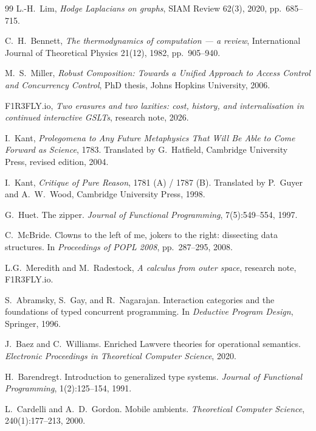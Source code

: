 \begin{thebibliography}{99}
L.-H.~Lim, \emph{Hodge Laplacians on graphs}, SIAM Review 62(3), 2020, pp.~685--715.

C.~H.~Bennett, \emph{The thermodynamics of computation --- a review}, International Journal of Theoretical Physics 21(12), 1982, pp.~905--940.

M.~S.~Miller, \emph{Robust Composition: Towards a Unified Approach to Access Control and Concurrency Control}, PhD thesis, Johns Hopkins University, 2006.

F1R3FLY.io, \emph{Two erasures and two laxities: cost, history, and internalisation in continued interactive GSLTs}, research note, 2026.


I.~Kant, \emph{Prolegomena to Any Future Metaphysics That Will Be Able to Come Forward as Science}, 1783. Translated by G.~Hatfield, Cambridge University Press, revised edition, 2004.

I.~Kant, \emph{Critique of Pure Reason}, 1781 (A) / 1787 (B). Translated by P.~Guyer and A.~W.~Wood, Cambridge University Press, 1998.

G.~Huet. The zipper. \emph{Journal of Functional Programming}, 7(5):549--554, 1997.

C.~McBride. Clowns to the left of me, jokers to the right: dissecting data structures. In \emph{Proceedings of POPL 2008}, pp.~287--295, 2008.

L.G.~Meredith and M.~Radestock, \emph{A calculus from outer space}, research note, F1R3FLY.io.




S.~Abramsky, S.~Gay, and R.~Nagarajan.
\newblock Interaction categories and the foundations of typed concurrent programming.
\newblock In \emph{Deductive Program Design}, Springer, 1996.

J.~Baez and C.~Williams.
\newblock Enriched Lawvere theories for operational semantics.
\newblock \emph{Electronic Proceedings in Theoretical Computer Science}, 2020.

H.~Barendregt.
\newblock Introduction to generalized type systems.
\newblock \emph{Journal of Functional Programming}, 1(2):125--154, 1991.

L.~Cardelli and A.~D.~Gordon.
\newblock Mobile ambients.
\newblock \emph{Theoretical Computer Science}, 240(1):177--213, 2000.


\end{thebibliography}
